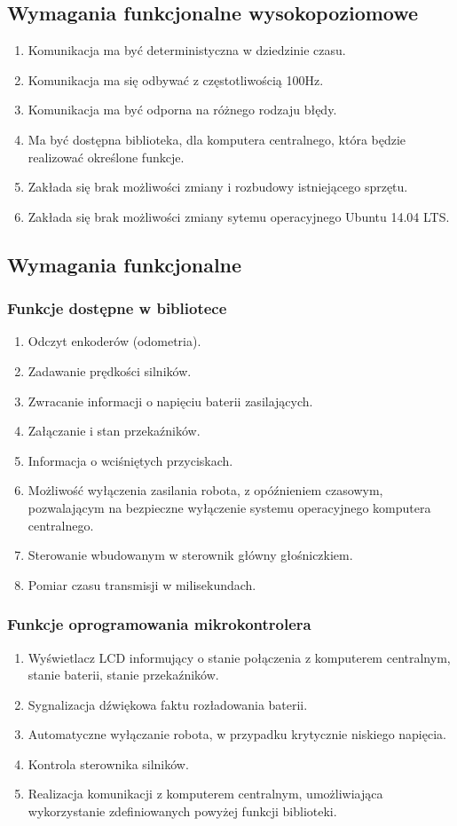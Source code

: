 \documentclass[a4paper, 12pt]{article}
\begin{document}
	\subsection{Wymagania funkcjonalne wysokopoziomowe}
	\begin{enumerate}
		\item Komunikacja ma być deterministyczna w dziedzinie czasu.
		\item Komunikacja ma się odbywać z częstotliwością 100Hz.
		\item Komunikacja ma być odporna na różnego rodzaju błędy.
		\item Ma być dostępna biblioteka, dla komputera centralnego, która będzie realizować określone funkcje.
		\item Zakłada się brak możliwości zmiany i rozbudowy istniejącego sprzętu.
		\item Zakłada się brak możliwości zmiany sytemu operacyjnego Ubuntu 14.04 LTS.
	\end{enumerate}
	\subsection{Wymagania funkcjonalne}
	\subsubsection{Funkcje dostępne w bibliotece}
	\begin{enumerate}
		\item Odczyt enkoderów (odometria).
		\item Zadawanie prędkości silników.
		\item Zwracanie informacji o napięciu baterii zasilających.
		\item Załączanie i stan przekaźników.
		\item Informacja o wciśniętych przyciskach.
		\item Możliwość wyłączenia zasilania robota, z opóźnieniem czasowym, pozwalającym na bezpieczne wyłączenie systemu operacyjnego komputera centralnego.
		\item Sterowanie wbudowanym w sterownik główny głośniczkiem.
		\item Pomiar czasu transmisji w milisekundach.
	\end{enumerate} 
	\subsubsection{Funkcje oprogramowania mikrokontrolera}
	\begin{enumerate}
		\item Wyświetlacz LCD informujący o stanie połączenia z komputerem centralnym, stanie baterii, stanie przekaźników.
		\item Sygnalizacja dźwiękowa faktu rozładowania baterii.
		\item Automatyczne wyłączanie robota, w przypadku krytycznie niskiego napięcia.
		\item Kontrola sterownika silników.
		\item Realizacja komunikacji z komputerem centralnym, umożliwiająca wykorzystanie zdefiniowanych powyżej funkcji biblioteki.
	\end{enumerate}
\end{document}
